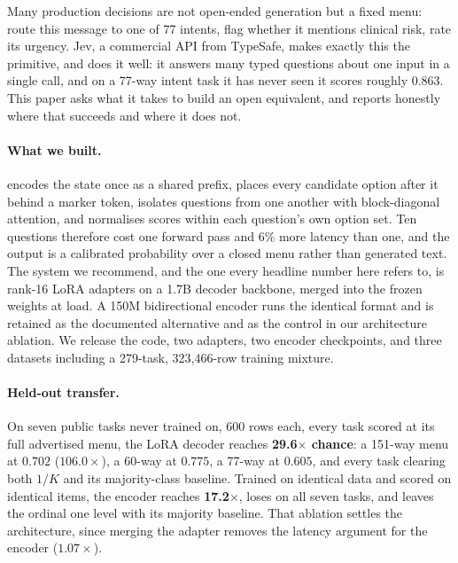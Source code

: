 Many production decisions are not open-ended generation but a fixed menu:
route this message to one of 77 intents, flag whether it mentions clinical
risk, rate its urgency. Jev, a commercial API from TypeSafe, makes exactly
this the primitive, and does it well: it answers many typed questions about
one input in a single call, and on a 77-way intent task it has never seen
it scores roughly $0.863$. This paper asks what it takes to build an open
equivalent, and reports honestly where that succeeds and where it does not.

\paragraph{What we built.} \openjev{} encodes the state once as a shared
prefix, places every candidate option after it behind a marker token,
isolates questions from one another with block-diagonal attention, and
normalises scores within each question's own option set. Ten questions
therefore cost one forward pass and 6\% more latency than one, and the
output is a calibrated probability over a closed menu rather than generated
text. The system we recommend, and the one every headline number here
refers to, is rank-16 LoRA adapters on a 1.7B decoder backbone, merged
into the frozen weights at load. A 150M bidirectional encoder runs the
identical format and is retained as the documented alternative and as the
control in our architecture ablation. We release the code, two adapters,
two encoder checkpoints, and three datasets including a 279-task,
323{,}466-row training mixture.

\paragraph{Held-out transfer.} On seven public tasks never trained on,
600 rows each, every task scored at its full advertised menu, the LoRA
decoder reaches \textbf{29.6$\times$ chance}: a 151-way menu at $0.702$
($106.0\times$), a 60-way at $0.775$, a 77-way at $0.605$, and every task
clearing both $1/K$ and its majority-class baseline. Trained on identical
data and scored on identical items, the encoder reaches
\textbf{17.2$\times$}, loses on all seven tasks, and leaves the ordinal
one level with its majority baseline. That ablation settles the
architecture, since merging the adapter removes the latency argument for
the encoder ($1.07\times$).

